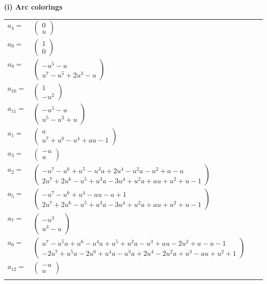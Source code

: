 \documentclass[1p]{elsarticle_modified}
\theoremstyle{definition}
\begin{document}
\flushleft \textbf{(i) Arc colorings}\\
\begin{tabular}{m{7pt} m{180pt} m{7pt} m{180pt} }
\flushright $a_{4}=$&$\begin{pmatrix}0\\u\end{pmatrix}$ \\
\flushright $a_{9}=$&$\begin{pmatrix}1\\0\end{pmatrix}$ \\
\flushright $a_{8}=$&$\begin{pmatrix}- u^5- u\\u^7- u^5+2 u^3- u\end{pmatrix}$ \\
\flushright $a_{10}=$&$\begin{pmatrix}1\\- u^2\end{pmatrix}$ \\
\flushright $a_{11}=$&$\begin{pmatrix}- u^5- u\\u^5- u^3+u\end{pmatrix}$ \\
\flushright $a_{1}=$&$\begin{pmatrix}a\\u^7+u^6- u^4+a u-1\end{pmatrix}$ \\
\flushright $a_{3}=$&$\begin{pmatrix}- u\\u\end{pmatrix}$ \\
\flushright $a_{2}=$&$\begin{pmatrix}- u^7- u^6+u^5- u^3 a+2 u^4- u^2 a- u^2+a- u\\2 u^7+2 u^6- u^5+u^3 a-3 u^4+u^2 a+a u+u^2+u-1\end{pmatrix}$ \\
\flushright $a_{5}=$&$\begin{pmatrix}- u^7- u^6+u^4- a u- a+1\\2 u^7+2 u^6- u^5+u^3 a-3 u^4+u^2 a+a u+u^2+u-1\end{pmatrix}$ \\
\flushright $a_{7}=$&$\begin{pmatrix}- u^3\\u^3- u\end{pmatrix}$ \\
\flushright $a_{6}=$&$\begin{pmatrix}u^7- u^5 a+u^6- u^4 a+u^5+u^2 a- u^3+a u-2 u^2+a- u-1\\-2 u^7+u^5 a-2 u^6+u^4 a- u^3 a+2 u^4-2 u^2 a+u^3- a u+u^2+1\end{pmatrix}$ \\
\flushright $a_{12}=$&$\begin{pmatrix}- u\\u\end{pmatrix}$\\&\end{tabular}
\end{document}
